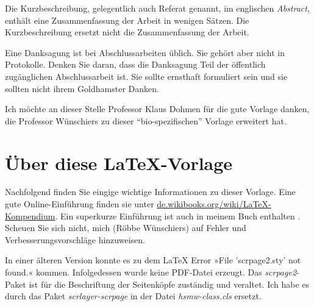 \documentclass[nomenclature, norefpage, oneside, glossary, hypertext,multiauthor]{hsmw-class}
\begin{document}





\begin{Kurzbeschreibung}
Die Kurzbeschreibung, gelegentlich auch Referat genannt, im englischen \textit{Abstract}, enthält eine Zusammenfassung der Arbeit in wenigen Sätzen. Die Kurzbeschreibung ersetzt nicht die Zusammenfassung der Arbeit.
\end{Kurzbeschreibung}


\begin{Danksagung}
Eine Danksagung ist bei Abschlussarbeiten üblich. Sie gehört aber nicht in Protokolle. Denken Sie daran, dass die Danksagung Teil der öffentlich zugänglichen Abschlussarbeit ist. Sie sollte ernsthaft formuliert sein und sie sollten nicht ihrem Goldhamster Danken.

Ich möchte an dieser Stelle Professor Klaus Dohmen für die gute Vorlage danken, die Professor Wünschiers zu dieser \enquote{bio-spezifischen} Vorlage erweitert hat.
\end{Danksagung}


\Hauptteil %

\chapter{Über diese \LaTeX{}-Vorlage}
Nachfolgend finden Sie eingige wichtige Informationen zu dieser Vorlage. Eine gute Online-Einführung finden sie unter \url{de.wikibooks.org/wiki/LaTeX-Kompendium}. Ein superkurze Einführung ist auch in meinem Buch enthalten \citep{Wuenschiers2016}.
Scheuen Sie sich nicht, mich (Röbbe Wünschiers) auf Fehler und Verbesserungsvorschläge hinzuweisen.

In einer älteren Version konnte es zu dem LaTeX Error »File 'scrpage2.sty' not found.« kommen. Infolgedessen wurde keine PDF-Datei erzeugt. Das \textit{scrpage2}-Paket ist für die Beschriftung der Seitenköpfe zuständig und veraltet. Ich habe es durch das Paket \textit{scrlayer-scrpage} in der Datei \textit{hsmw-class.cls} ersetzt.
\end{document}
